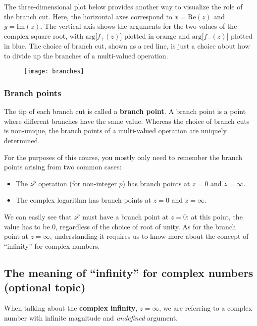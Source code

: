 \documentclass[10pt,a4paper]{article}
\begin{document}
The three-dimensional plot below provides another way to visualize the
role of the branch cut.  Here, the horizontal axes correspond to $x =
\mathrm{Re}(z)$ and $y = \mathrm{Im}(z)$. The vertical axis shows the
arguments for the two values of the complex square root, with
$\mathrm{arg}\big[f_+(z)\big]$ plotted in orange and
$\mathrm{arg}\big[f_-(z)\big]$ plotted in blue. The choice of branch
cut, shown as a red line, is just a choice about how to divide up the
branches of a multi-valued operation.

\begin{figure}[h]
  \centering\texttt{[image: branches]}
\end{figure}

\subsubsection{Branch points}
\label{branch-points}

The tip of each branch cut is called a \textbf{branch point}. A branch
point is a point where different branches have the same value. Whereas
the choice of branch cuts is non-unique, the branch points of a
multi-valued operation are uniquely determined.

For the purposes of this course, you mostly only need to remember the
branch points arising from two common cases:

\begin{itemize}
\item The $z^p$ operation (for non-integer $p$) has branch points at
  $z = 0$ and $z = \infty$.

\item The complex logarithm has branch points at $z = 0$ and $z = \infty$.
\end{itemize}

\noindent
We can easily see that $z^p$ must have a branch point at $z = 0$: at
this point, the value has to be $0$, regardless of the choice of root
of unity. As for the branch point at $z = \infty$, understanding it
requires us to know more about the concept of ``infinity'' for complex
numbers.

\subsection{The meaning of ``infinity'' for complex numbers (optional topic)}
\label{aside-the-meaning-of-infinity-for-complex-numbers}

When talking about the \textbf{complex infinity}, $z = \infty$, we are
referring to a complex number with infinite magnitude and
\textit{undefined} argument.
\end{document}
